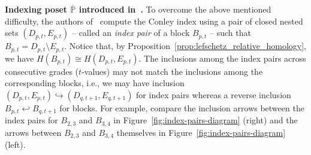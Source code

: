 \documentclass[letterpaper,11pt]{article}
\theoremstyle{plain}
\theoremstyle{definition}
\def\cB{\text{$\mathcal B$}}
\newcounter{li}
\newcommand{\BD}{\cB}
\newcommand{\idxfwd}[1]{{\iota}_{#1}}
\newcommand{\idxbck}[1]{\overleftarrow{\iota}_{\!\!#1}}
\newcommand\michal[1]{\textcolor{ForestGreen}{[ML: #1]}}
\begin{document}
\textbf{Indexing poset $\overline{\mathbb{P}}$ introduced in~\cite{CMbarcodes2025}.}
To overcome the above mentioned difficulty, the authors of~\cite{CMbarcodes2025}
    compute the Conley index using a pair of closed nested sets $(D_{p,t},E_{p,t})$ -- called an \emph{index pair} of a block $B_{p,t}$ -- such that $B_{p,t}=D_{p,t}\setminus E_{p,t}$. 
    Notice that, by Proposition~\ref{prop:lefschetz_relative_homology}, we have $H(B_{p,t})\cong H(D_{p,t},E_{p,t})$.
The inclusions among the index pairs across consecutive grades ($t$-values) may not match
the inclusions among the corresponding blocks, i.e., 
we may have inclusion $(D_{p,t},E_{p,t})\hookrightarrow (D_{q,t+1},E_{q,t+1})$
for index pairs whereas a reverse inclusion $B_{p,t} \hookleftarrow B_{q,t+1}$ for blocks.
For example, compare the inclusion arrows between the index pairs for $B_{2,3}$
and $B_{3,4}$ in Figure~\ref{fig:index-pairs-diagram} (right) and the arrows between $B_{2,3}$ and $B_{3,4}$ themselves in Figure~\ref{fig:index-pairs-diagram} (left).
\end{document}
